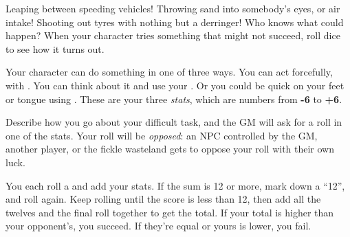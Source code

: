 
Leaping between speeding vehicles! Throwing sand into somebody's eyes, or air intake! Shooting out tyres with nothing but a derringer! Who knows what could happen? When your character tries something that might not succeed, roll dice to see how it turns out.

Your character can do something in one of three ways. You can act forcefully, with \stat{\statPhysical}. You can think about it and use your \stat{\statMental}. Or you could be quick on your feet or tongue using \stat{\statSkill}. These are your three \emph{stats}, which are numbers from \textbf{-6} to \textbf{+6}.

Describe how you go about your difficult task, and the GM will ask for a roll in one of the stats. Your roll will be \emph{opposed}: an NPC controlled by the GM, another player, or the fickle wasteland gets to oppose your roll with their own luck.

You each roll a  and add your stats. If the sum is 12 or more, mark down a ``12'', and roll again. Keep rolling until the score is less than 12, then add all the twelves and the final roll together to get the total. If your total is higher than your opponent's, you succeed. If they're equal or yours is lower, you fail.
